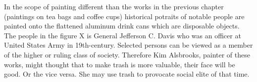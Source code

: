 


In the scope of painting different than the works in the previous chapter (paintings on tea bags and coffee cups) historical potraits of notable people are painted onto the flattened aluminum drink cans which are disposable objects. The people in the figure X is General Jefferson C. Davis who was an officer at United States Army in 19th-century. Selected persons can be viewed as a member of the higher or ruling class of society. Therefore Kim Alsbrooks, painter of these works, might thought that to make trash is more valuable, their face will be good. Or the vice versa. She may use trash to provocate social elite of that time. 

